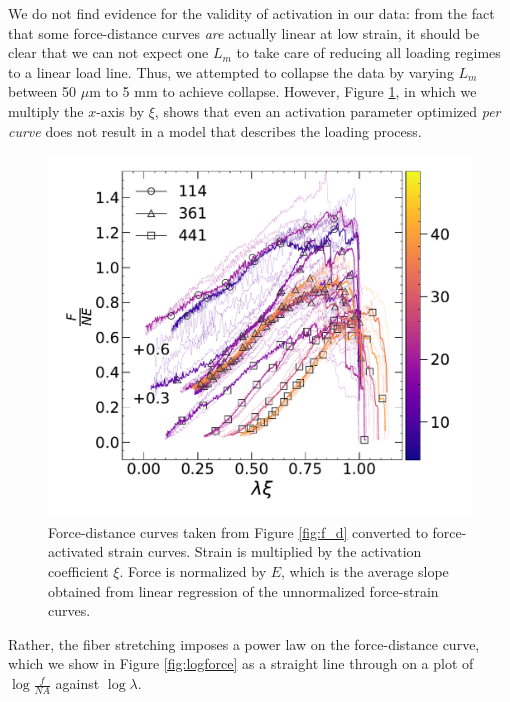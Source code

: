 \documentclass{article}
\begin{document}
We do not find evidence for the validity of activation in our data: from the fact that 
some force-distance curves \textit{are} actually linear at low strain, it should be 
clear that we can not expect one $L_m$ to take care of reducing all loading regimes
to a linear load line. Thus, we attempted to collapse the data by varying $L_m$ between
50 $\mu$m to 5 mm to achieve collapse. However, Figure \ref{fig:inact_domain}, in which we 
multiply the $x$-axis by $\xi$, shows that even an activation parameter optimized \textit{per curve}
does not result in a model that describes the loading process. 

\begin{figure}
    \includegraphics[width=0.9\linewidth]{inact_domain.pdf}
    \caption{Force-distance curves taken from Figure \ref{fig:f_d} converted to force-activated strain
    curves. Strain is multiplied by the activation coefficient $\xi$. Force is normalized by
    $E$, which is the average slope obtained from linear regression of the unnormalized force-strain curves.
    \label{fig:inact_domain}}
\end{figure}

Rather, the fiber stretching imposes a power law on the force-distance curve, which
we show in Figure \ref{fig:logforce} as a straight line through on a plot of $\log \frac{f}{NA}$
against $\log \lambda$.  
\end{document}
